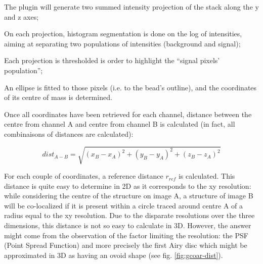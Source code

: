 \documentclass[a4paper, 11pt]{report}%
\begin{document}
\begin{enumerate*}
	\item The plugin will generate two summed intensity projection of the stack along the y and z axes;
	\item On each projection, histogram segmentation is done on the log of intensities, aiming at separating two populations of intensities (background and signal);
	\item Each projection is thresholded is order to highlight the ``signal pixels' population'';
	\item An ellipse is fitted to those pixels (i.e. to the bead's outline), and the coordinates of its centre of mass is determined.
	\item Once all coordinates have been retrieved for each channel, distance between the centre from channel A and centre from channel B is calculated (in fact, all combinaisons of distances are calculated):
	
	\begin{equation}
		dist_{A-B}=\sqrt{(x_{B}-x_{A})^2+(y_{B}-y_{A})^2+(z_{B}-z_{A})^2}
		\label{eqn:gcoar-dist}
	\end{equation}
	
	\item For each couple of coordinates, a reference distance $r_{ref}$ is calculated. This distance is quite easy to determine in 2D as it corresponds to the xy resolution: while considering the centre of the structure on image A, a structure of image B will be co-localized if it is present within a circle traced around centre A of a radius equal to the xy resolution. Due to the disparate resolutions over the three dimensions, this distance is not so easy to calculate in 3D. However, the answer might come from the observation of the factor limiting the resolution: the PSF (Point Spread Function) and more precisely the first Airy disc which might be approximated in 3D as having an ovoid shape (see fig. \ref{fig:gcoar-dist}).
	

\end{enumerate*}
\end{document}
